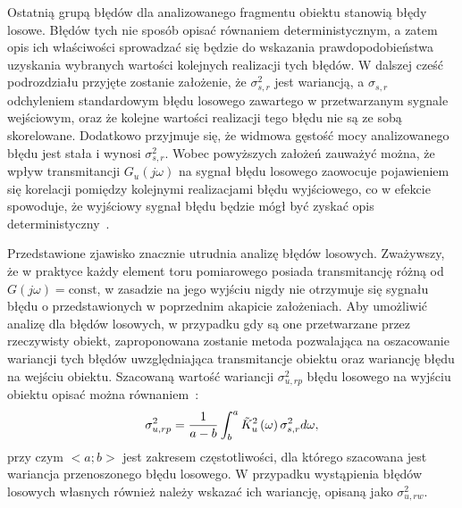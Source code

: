 Ostatnią grupą błędów dla analizowanego fragmentu obiektu stanowią błędy losowe. Błędów tych nie sposób opisać równaniem deterministycznym, a zatem opis ich właściwości sprowadzać się będzie do wskazania prawdopodobieństwa uzyskania wybranych wartości kolejnych realizacji tych błędów. W dalszej cześć podrozdziału przyjęte zostanie założenie, że $\sigma_{s,r}^{2}$ jest wariancją, a $\sigma_{s,r}$ odchyleniem standardowym błędu losowego zawartego w przetwarzanym sygnale wejściowym, oraz że kolejne wartości realizacji tego błędu nie są ze sobą skorelowane. Dodatkowo przyjmuje się, że widmowa gęstość mocy analizowanego błędu jest stała i wynosi $\sigma_{s,r}^{2}$. Wobec powyższych założeń zauważyć można, że wpływ transmitancji $G_{u}(j\omega)$ na sygnał błędu losowego zaowocuje pojawieniem się korelacji pomiędzy kolejnymi realizacjami błędu wyjściowego, co w efekcie spowoduje, że wyjściowy sygnał błędu będzie mógł być zyskać opis deterministyczny~\cite{bibbona_filter, benassi_filter}.

Przedstawione zjawisko znacznie utrudnia analizę błędów losowych. Zważywszy, że w praktyce każdy element toru pomiarowego posiada transmitancję różną od $G(j\omega) = \text{const}$, w zasadzie na jego wyjściu nigdy nie otrzymuje się sygnału błędu o przedstawionych w poprzednim akapicie założeniach. Aby umożliwić analizę dla błędów losowych, w przypadku gdy są one przetwarzane przez rzeczywisty obiekt, zaproponowana zostanie metoda pozwalająca na oszacowanie wariancji tych błędów uwzględniająca transmitancje obiektu oraz wariancję błędu na wejściu obiektu. Szacowaną wartość wariancji $\sigma_{u,rp}^{2}$ błędu losowego na wyjściu obiektu opisać można równaniem~\cite{jadziak_dsp, proakis_dsp}:
\begin{equation}
\sigma_{u,rp}^{2} = \frac{1}{a - b} \int _{b} ^{a} \tilde{K}_{u}^{2} \left(\omega\right) \sigma_{s,r}^{2} d\omega \label{eq:mid_cont_var_rand},
\end{equation}
przy czym $<a;b>$ jest zakresem częstotliwości, dla którego szacowana jest wariancja przenoszonego błędu losowego. W przypadku wystąpienia błędów losowych własnych również należy wskazać ich wariancję, opisaną jako $\sigma_{u,rw}^{2}$.

